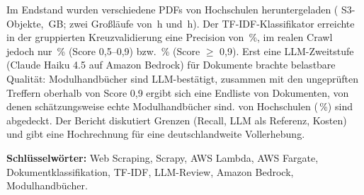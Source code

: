 \documentclass[a4paper,11pt,headings=small,parskip=half-,numbers=noenddot,bibliography=totoc]{scrreprt}
\renewcommand{\_}{\textunderscore\allowbreak{}}
\begin{document}
Im Endstand wurden \zDocsTotal{} verschiedene PDFs von \zUnisTotal{} Hochschulen heruntergeladen (\zSpeicherObjekte{} S3-Objekte, \zSpeicherGB{}\,GB; zwei Großläufe von \zDauerAug{}\,h und \zDauerDeep{}\,h). Der TF-IDF-Klassifikator erreichte in der gruppierten Kreuzvalidierung eine Precision von \zTrainPrec{}\,\%, im realen Crawl jedoch nur \zMidPrec{}\,\% (Score 0,5--0,9) bzw. \zPilotPct{}\,\% (Score $\ge$ 0,9). Erst eine LLM-Zweitstufe (Claude Haiku 4.5 auf Amazon Bedrock) für \zLLMReviewed{} Dokumente brachte belastbare Qualität: \zLLMConfirmed{} Modulhandbücher sind LLM-bestätigt, zusammen mit den ungeprüften Treffern oberhalb von Score 0,9 ergibt sich eine Endliste von \zFinalListed{} Dokumenten, von denen schätzungsweise \zEstTrue{} echte Modulhandbücher sind. \zUnisLikely{} von \zUnisTotal{} Hochschulen (\zUnisLikelyPct{}\,\%) sind abgedeckt. Der Bericht diskutiert Grenzen (Recall, LLM als Referenz, Kosten) und gibt eine Hochrechnung für eine deutschlandweite Vollerhebung.

\vspace{0.8em}
\noindent\textbf{Schlüsselwörter:} Web Scraping, Scrapy, AWS Lambda, AWS Fargate, Dokumentklassifikation, TF-IDF, LLM-Review, Amazon Bedrock, Modulhandbücher.

\tableofcontents
\listoffigures
\listoftables

\clearpage
{}












\appendix




\end{document}
